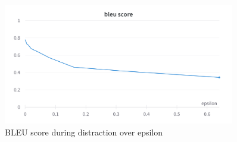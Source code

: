 \begin{figure}
    \includegraphics[width=0.9\textwidth]{figures/distraction_bleu_score_over_epsilon.png}
    \caption{BLEU score during distraction over epsilon}
\end{figure}
